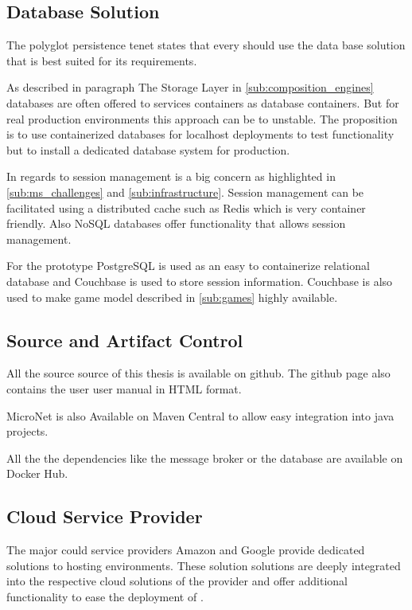 \subsection{Database Solution}

The polyglot persistence tenet states that every \ms{} should use the data base
solution that is best suited for its requirements.

As described in paragraph The Storage Layer in \autoref{sub:composition_engines}
databases are often offered to services containers as database containers. But
for real production environments this approach can be to
unstable\cite{cazorla2017db_containers}. The proposition is to use containerized
databases for localhost deployments to test functionality but to install a
dedicated database system for production.

In regards to \og{} session management is a big concern as highlighted in
\autoref{sub:ms_challenges} and \autoref{sub:infrastructure}. Session management
can be facilitated using a distributed cache such as Redis which is very
container friendly. Also NoSQL databases offer functionality that allows session
management.

For the prototype PostgreSQL is used as an easy to containerize relational
database and Couchbase is used to store session information. Couchbase is also
used to make game model described in \autoref{sub:games} highly available.

\subsection{Source and Artifact Control}

All the source source of this thesis is available on
github\cite{micronet2017doku}. The github page also contains the user user
manual in HTML format.

MicroNet is also Available on Maven Central to allow easy integration into java
projects.

All the the dependencies like the message broker or the database are available
on Docker Hub.

\subsection{Cloud Service Provider}

The major could service providers Amazon and Google provide dedicated solutions
to hosting \og{} environments. These solution solutions are deeply integrated
into the respective cloud solutions of the provider and offer additional
functionality to ease the deployment of \ogs{}.

